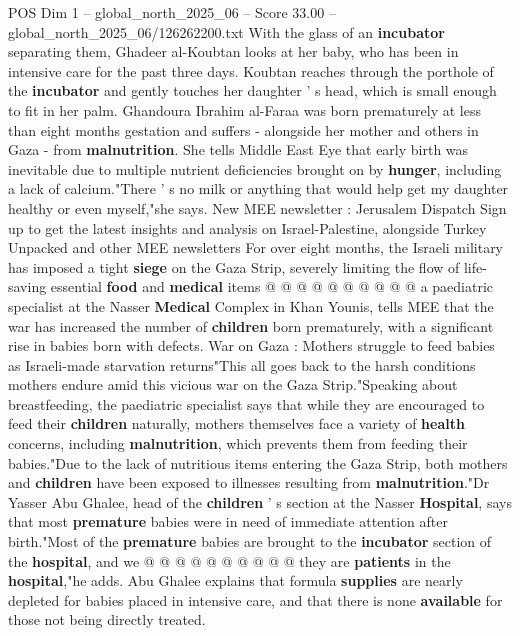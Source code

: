 \begin{textsample}{POS Dim 1 – global\_north\_2025\_06 – Score 33.00 – global\_north\_2025\_06/126262200.txt}  \label{ex:f1_pos_306}
With the glass of an \textbf{incubator} separating them, Ghadeer al-Koubtan looks at her baby, who has been in intensive care for the past three days.
Koubtan reaches through the porthole of the \textbf{incubator} and gently touches her daughter ' s head, which is small enough to fit in her palm.
Ghandoura Ibrahim al-Faraa was born prematurely at less than eight months gestation and suffers - alongside her mother and others in Gaza - from \textbf{malnutrition}.
She tells Middle East Eye that early birth was inevitable due to multiple nutrient deficiencies brought on by \textbf{hunger}, including a lack of calcium."There ' s no milk or anything that would help get my daughter healthy or even myself,"she says.
New MEE newsletter : Jerusalem Dispatch Sign up to get the latest insights and analysis on Israel-Palestine, alongside Turkey Unpacked and other MEE newsletters For over eight months, the Israeli military has imposed a tight \textbf{siege} on the Gaza Strip, severely limiting the flow of life-saving essential \textbf{food} and \textbf{medical} items @ @ @ @ @ @ @ @ @ @ a paediatric specialist at the Nasser \textbf{Medical} Complex in Khan Younis, tells MEE that the war has increased the number of \textbf{children} born prematurely, with a significant rise in babies born with defects.
War on Gaza : Mothers struggle to feed babies as Israeli-made starvation returns"This all goes back to the harsh conditions mothers endure amid this vicious war on the Gaza Strip."Speaking about breastfeeding, the paediatric specialist says that while they are encouraged to feed their \textbf{children} naturally, mothers themselves face a variety of \textbf{health} concerns, including \textbf{malnutrition}, which prevents them from feeding their babies."Due to the lack of nutritious items entering the Gaza Strip, both mothers and \textbf{children} have been exposed to illnesses resulting from \textbf{malnutrition}."Dr Yasser Abu Ghalee, head of the \textbf{children} ' s section at the Nasser \textbf{Hospital}, says that most \textbf{premature} babies were in need of immediate attention after birth."Most of the \textbf{premature} babies are brought to the \textbf{incubator} section of the \textbf{hospital}, and we @ @ @ @ @ @ @ @ @ @ they are \textbf{patients} in the \textbf{hospital},"he adds.
Abu Ghalee explains that formula \textbf{supplies} are nearly depleted for babies placed in intensive care, and that there is none \textbf{available} for those not being directly treated.

\end{textsample}
